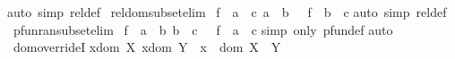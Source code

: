 \begin{isabellebody}
%
\isadelimproof
%
\endisadelimproof
%
\isatagproof
{}\isamarkupfalse%
{\isacharparenleft}auto\ simp{\isacharcolon}\ rel{\isacharunderscore}def{\isacharparenright}%
\endisatagproof
{\isafoldproof}%
%
\isadelimproof
\isanewline
%
\endisadelimproof
\isanewline
\isanewline
{}\isamarkupfalse%
\ rel{\isacharunderscore}dom{\isacharunderscore}subset{\isacharbrackleft}elim{\isacharbang}{\isacharbrackright}{\isacharcolon}\isanewline
{\isachardoublequoteopen}{\isacharbrackleft}{\isacharbar}\ f\ {\isacharcolon}\ a\ {\isacharless}{\isacharminus}{\isacharminus}{\isachargreater}\ c{\isacharsemicolon}\ a\ {\isacharless}{\isacharequal}\ b\ {\isacharbar}{\isacharbrackright}\ {\isacharequal}{\isacharequal}{\isachargreater}\ f\ {\isacharcolon}\ b\ {\isacharless}{\isacharminus}{\isacharminus}{\isachargreater}\ c{\isachardoublequoteclose}\isanewline
%
\isadelimproof
%
\endisadelimproof
%
\isatagproof
{}\isamarkupfalse%
{\isacharparenleft}auto\ simp{\isacharcolon}\ rel{\isacharunderscore}def{\isacharparenright}%
\endisatagproof
{\isafoldproof}%
%
\isadelimproof
\isanewline
%
\endisadelimproof
\isanewline
\isanewline
{}\isamarkupfalse%
\ pfun{\isacharunderscore}ran{\isacharunderscore}subset{\isacharbrackleft}elim{\isacharbang}{\isacharbrackright}{\isacharcolon}\isanewline
{\isachardoublequoteopen}{\isacharbrackleft}{\isacharbar}\ f\ {\isacharcolon}\ a\ {\isacharminus}{\isacharbar}{\isacharminus}{\isachargreater}\ b{\isacharsemicolon}\ b\ {\isacharless}{\isacharequal}\ c\ {\isacharbar}{\isacharbrackright}\ {\isacharequal}{\isacharequal}{\isachargreater}\ f\ {\isacharcolon}\ a\ {\isacharminus}{\isacharbar}{\isacharminus}{\isachargreater}\ c{\isachardoublequoteclose}\isanewline
%
\isadelimproof
%
\endisadelimproof
%
\isatagproof
{}\isamarkupfalse%
{\isacharparenleft}simp\ only{\isacharcolon}\ pfun{\isacharunderscore}def{\isacharparenright}\isanewline
{}\isamarkupfalse%
{\isacharparenleft}auto{\isacharparenright}\isanewline
{}\isamarkupfalse%
%
\endisatagproof
{\isafoldproof}%
%
\isadelimproof
\isanewline
%
\endisadelimproof
\isanewline
{}\isamarkupfalse%
\ dom{\isacharunderscore}override{\isacharunderscore}I{\isacharcolon}\isanewline
{\isachardoublequoteopen}{\isacharbrackleft}{\isacharbar}x{\isacharcolon}dom\ X{\isacharsemicolon}\ x{\isacharcolon}dom\ Y{\isacharbar}{\isacharbrackright}\ {\isacharequal}{\isacharequal}{\isachargreater}\ x\ {\isacharcolon}\ dom\ {\isacharparenleft}X\ {\isacharparenleft}{\isacharplus}{\isacharparenright}\ Y{\isacharparenright}{\isachardoublequoteclose}\isanewline

\end{isabellebody}
